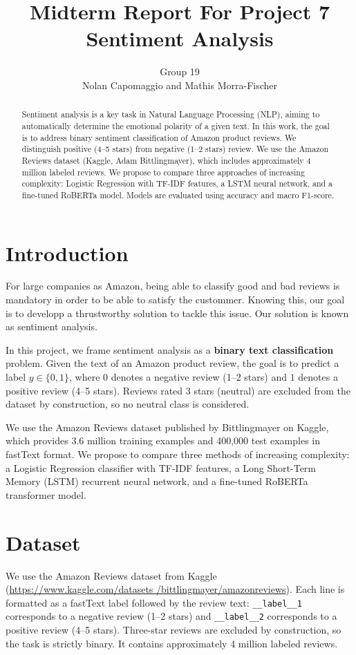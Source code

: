 \documentclass{article}
\title{Midterm Report For Project 7\\Sentiment Analysis}
\author{
  Group 19 \\
  Nolan Capomaggio and Mathis Morra-Fischer \\
}
\begin{document}
\maketitle

\begin{abstract}
  Sentiment analysis is a key task in Natural Language Processing (NLP), 
  aiming to automatically determine the emotional polarity of a given text. 
  In this work, the goal is to address binary sentiment classification of Amazon 
  product reviews. We distinguish positive (4–5 stars) from negative (1–2 stars) 
  review. We use the Amazon Reviews dataset (Kaggle, Adam Bittlingmayer), 
  which includes approximately 4 million labeled reviews. We propose to compare 
  three approaches of increasing complexity: Logistic Regression with TF-IDF 
  features, a LSTM neural network, and a fine-tuned RoBERTa 
  model. Models are evaluated using accuracy and macro F1-score.
\end{abstract}


\section{Introduction}
For large companies as Amazon, being able to classify good and bad reviews is 
mandatory in order to be able to satisfy the custommer. Knowing this, our 
goal is to developp a thrustworthy solution to tackle this issue. Our solution 
is known as sentiment analysis.

In this project, we frame sentiment analysis as a \textbf{binary text classification}
problem.
Given the text of an Amazon product review, the goal is to predict a label
$y \in \{0, 1\}$, where $0$ denotes a negative review (1–2 stars) and $1$ denotes
a positive review (4–5 stars).
Reviews rated 3 stars (neutral) are excluded from the dataset by construction,
so no neutral class is considered.

We use the Amazon Reviews dataset published by Bittlingmayer on Kaggle,
which provides 3.6 million training examples and 400,000 test examples in fastText
format.
We propose to compare three methods of increasing complexity: a Logistic Regression
classifier with TF-IDF features, a Long Short-Term Memory (LSTM) recurrent neural
network, and a fine-tuned RoBERTa transformer model.


\section{Dataset}
We use the Amazon Reviews dataset from Kaggle (\url{https://www.kaggle.com/datasets
/bittlingmayer/amazonreviews}). 
Each line is formatted as a fastText label followed by the review text:
\texttt{\_\_label\_\_1} corresponds to a negative review (1--2 stars) and
\texttt{\_\_label\_\_2} corresponds to a positive review (4--5 stars).
Three-star reviews are excluded by construction, so the task is strictly binary.
It contains approximately 4 million labeled reviews.
\end{document}
